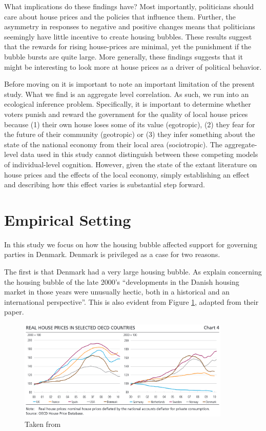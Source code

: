 \documentclass[12pt,a4paper]{article}
\begin{document}
What implications do these findings have? Most importantly, politicians should care about house prices and the policies that influence them.  Further, the asymmetry in responses to negative and positive changes means that politicians seemingly have little incentive to create housing bubbles. These results suggest that the rewards for rising house-prices are minimal, yet the punishment if the bubble bursts are quite large. More generally, these findings suggests that it might be interesting to look more at house prices as a driver of political behavior.

Before moving on it is important to note an important limitation of the present study. What we find is an aggregate level correlation. As such, we run into an ecological inference problem. Specifically, it is important to determine whether voters punish and reward the government for the quality of local house prices  because (1) their own house loses some of its value (egotropic), (2) they fear for the future of their community (geotropic) or (3) they infer something about the state of the national economy from their local area (sociotropic). The aggregate-level data used in this study cannot distinguish between these competing models of individual-level cognition. However, given the state of the extant literature on house prices and the effects of the local economy, simply establishing an effect and describing how this effect varies is substantial step forward. 

\section{Empirical Setting}

In this study we focus on how the housing bubble affected support for governing parties in Denmark. Denmark is privileged as a case for two reasons.

The first is that Denmark had a very large housing bubble. As \cite[][49]{dam2011housing} explain concerning the housing bubble of the late 2000's ``developments in the Danish housing market in those years were unusually hectic, both in a historical and an international perspective''. This is also evident from Figure \ref{dam}, adapted from their paper. 

\begin{figure}[htbp!]
	\includegraphics[width=0.9\textwidth]{../figures/intcomparison}
	\centering
	\caption{Taken from \citet[50]{dam2011housing}}\label{dam}
\end{figure}
\end{document}
